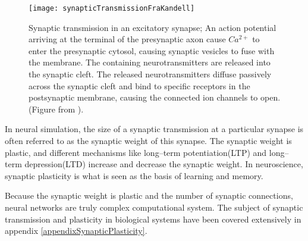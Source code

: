 \begin{figure}[hbt!p]
    \centering
    \texttt{[image: synapticTransmissionFraKandell]}	%
 	  \caption[Synaptic transmission in an excitatory synapse]
			{Synaptic transmission in an excitatory synapse; 
			An action potential arriving at the terminal of the presynaptic axon cause $Ca^{2+}$ to enter the presynaptic cytosol, causing synaptic vesicles to fuse with the membrane.
			The containing neurotransmitters are released into the synaptic cleft.
			The released neurotransmitters diffuse passively across the synaptic cleft and bind to specific receptors in the postsynaptic membrane, causing the connected ion channels to open.
			(Figure from \cite{PrinciplesOfNeuralScience4edKAP10}).
			}
    \label{figActionPotential}
\end{figure}

		In neural simulation, the size of a synaptic transmission at a particular synapse is often referred to as the synaptic weight of this synapse.
		The synaptic weight is plastic, and different mechanisms like long--term potentiation(LTP) and long--term depression(LTD) increase and decrease the synaptic weight.
		In neuroscience, synaptic plasticity is what is seen as the basis of learning and memory\cite{NeuroscienceExploringTheBrain3edKAP25}. %

		Because the synaptic weight is plastic and the number of synaptic connections, neural networks are truly complex computational system.
		The subject of synaptic transmission and plasticity in biological systems have been covered extensively in appendix \ref{appendixSynapticPlasticity}.



